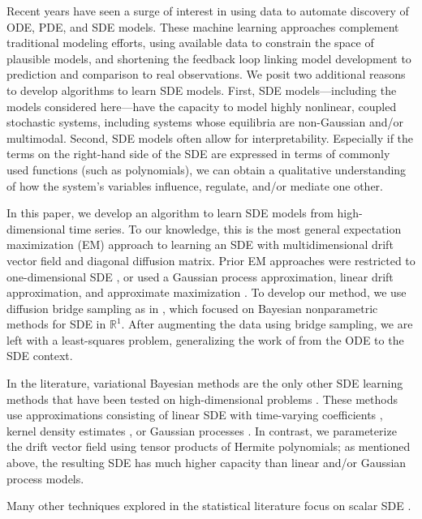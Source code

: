 \documentclass{article}
\begin{document}
Recent years have seen a surge of interest in using data to automate discovery of ODE, PDE, and SDE models.  These machine learning approaches complement traditional modeling efforts, using available data to constrain the space of plausible models, and shortening the feedback loop linking model development to prediction and comparison to real observations.  We posit two additional reasons to develop algorithms to learn SDE models.  First, SDE models---including the models considered here---have the capacity to model highly nonlinear, coupled stochastic systems, including systems whose equilibria are non-Gaussian and/or multimodal.  Second, SDE models often allow for interpretability.  Especially if the terms on the right-hand side of the SDE are expressed in terms of commonly used functions (such as polynomials), we can obtain a qualitative understanding of how the system's variables influence, regulate, and/or mediate one other. 

In this paper, we develop an algorithm to learn SDE models from high-dimensional time series.  To our knowledge, this is the most general expectation maximization (EM) approach to learning an SDE with multidimensional drift vector field and diagonal diffusion matrix.  Prior EM approaches were restricted to one-dimensional SDE \cite{ghahramani_learning_1999}, or used a Gaussian process approximation, linear drift approximation, and approximate maximization \cite{ruttor_approximate_2013}.  To develop our method, we use diffusion bridge sampling as in \cite{van_der_meulen_reversible_2014, meulen_adaptive_2017}, which focused on Bayesian nonparametric methods for SDE in $\mathbb{R}^1$.  After augmenting the data using bridge sampling, we are left with a least-squares problem, generalizing the work of \cite{brunton_discovering_2016} from the ODE to the SDE context.

In the literature, variational Bayesian methods are the only other SDE learning methods that have been tested on high-dimensional problems \cite{vrettas_variational_2015}.  These methods use approximations consisting of linear SDE with time-varying coefficients \cite{archambeau_variational_2008}, kernel density estimates \cite{batz_variational_2016}, or Gaussian processes \cite{batz_approximate_2017}.  In contrast, we parameterize the drift vector field using tensor products of Hermite polynomials; as mentioned above, the resulting SDE has much higher capacity than linear and/or Gaussian process models.

Many other techniques explored in the statistical literature focus on scalar SDE \cite{nicolau_nonparametric_2007, muller_empirical_2010, verzelen_inferring_2012, bhat_nonparametric_2016}.
\end{document}
